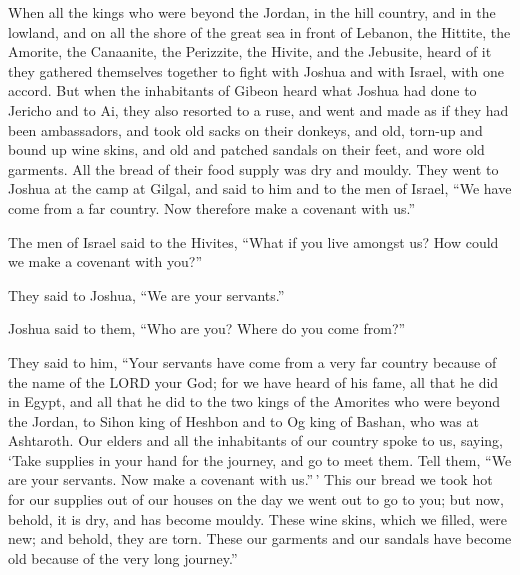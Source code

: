  When all the kings who were beyond the Jordan, in the
hill country, and in the lowland, and on all the shore of the great sea
in front of Lebanon, the Hittite, the Amorite, the Canaanite, the
Perizzite, the Hivite, and the Jebusite, heard of it  they
gathered themselves together to fight with Joshua and with Israel, with
one accord.  But when the inhabitants of Gibeon heard what
Joshua had done to Jericho and to Ai,  they also resorted
to a ruse, and went and made as if they had been ambassadors, and took
old sacks on their donkeys, and old, torn-up and bound up wine skins,
 and old and patched sandals on their feet, and wore old
garments. All the bread of their food supply was dry and mouldy.
 They went to Joshua at the camp at Gilgal, and said to
him and to the men of Israel, ``We have come from a far country. Now
therefore make a covenant with us.''

 The men of Israel said to the Hivites, ``What if you live
amongst us? How could we make a covenant with you?''

 They said to Joshua, ``We are your servants.''

Joshua said to them, ``Who are you? Where do you come from?''

 They said to him, ``Your servants have come from a very
far country because of the name of the LORD your God; for we have heard
of his fame, all that he did in Egypt,  and all that he
did to the two kings of the Amorites who were beyond the Jordan, to
Sihon king of Heshbon and to Og king of Bashan, who was at Ashtaroth.
 Our elders and all the inhabitants of our country spoke
to us, saying, `Take supplies in your hand for the journey, and go to
meet them. Tell them, ``We are your servants. Now make a covenant with
us.''\,'  This our bread we took hot for our supplies out
of our houses on the day we went out to go to you; but now, behold, it
is dry, and has become mouldy.  These wine skins, which
we filled, were new; and behold, they are torn. These our garments and
our sandals have become old because of the very long journey.''


